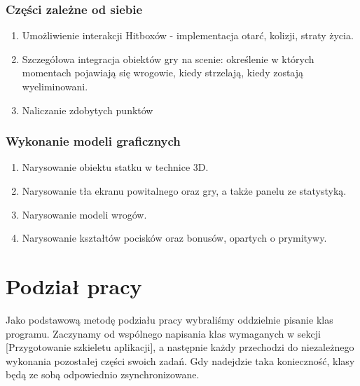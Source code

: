 \documentclass[a4paper,twoside]{article}
\begin{document}
		\section{Części zależne od siebie}
			\begin{enumerate}[label=\alph*.]
				\item Umożliwienie interakcji Hitboxów - implementacja otarć, kolizji, straty życia.
				\item Szczegółowa integracja obiektów gry na scenie: określenie w których momentach pojawiają się wrogowie, kiedy strzelają, kiedy zostają wyeliminowani.
				\item Naliczanie zdobytych punktów
			\end{enumerate}
		\section{Wykonanie modeli graficznych}
			\begin{enumerate}[label=\alph*.]
				\item Narysowanie obiektu statku w technice 3D.
				\item Narysowanie tła ekranu powitalnego oraz gry, a także panelu ze statystyką.
				\item Narysowanie modeli wrogów.
				\item Narysowanie kształtów pocisków oraz bonusów, opartych o prymitywy.
			\end{enumerate}
		
	
	\newpage
	
	\part{Podział pracy}
		Jako podstawową metodę podziału pracy wybraliśmy oddzielnie pisanie klas programu. Zaczynamy od wspólnego napisania klas wymaganych w sekcji [Przygotowanie szkieletu aplikacji], a następnie każdy przechodzi do niezależnego wykonania pozostałej części swoich zadań. Gdy nadejdzie taka konieczność, klasy będą ze sobą odpowiednio zsynchronizowane.
	
	
\end{document}
